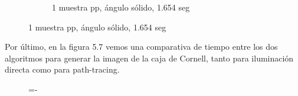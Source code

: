 \begin{figure}[h!]
{\begin{minipage}{\dimexpr .5\textwidth-\fboxsep-2\fboxrule}
\begin{subfigure}{\textwidth}
            \caption{1 muestra pp, ángulo sólido, 1.654 seg}
            \end{subfigure}  
    \end{minipage}}
\end{figure}

Por último, en la figura 5.7 vemos una comparativa de tiempo entre los dos algoritmos para generar la imagen de la caja de Cornell, tanto para iluminación directa como para path-tracing.

\begin{figure}[h!]
  \lineskip=-\fboxrule
\end{figure}
